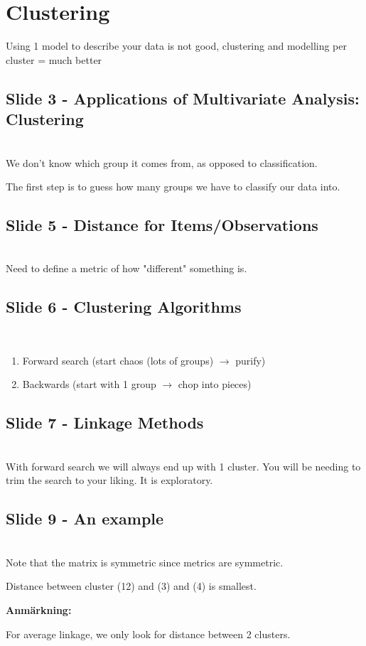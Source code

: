 \section{Clustering}
Using 1 model to describe your data is not good, clustering and modelling per cluster = much better
\par\bigskip
\subsection{Slide 3 - Applications of Multivariate Analysis: Clustering}\hfill\\
\noindent We don't know which group it comes from, as opposed to classification.\par
\noindent The first step is to guess how many groups we have to classify our data into.
\par\bigskip
\subsection{Slide 5 - Distance for Items/Observations}\hfill\\
Need to define a metric of how "different" something is.
\par\bigskip
\subsection{Slide 6 - Clustering Algorithms}\hfill\\
\begin{enumerate}[leftmargin=*]
  \item Forward search (start chaos (lots of groups) $\rightarrow$ purify)
    \par\bigskip
  \item Backwards (start with 1 group $\rightarrow$ chop into pieces)
\end{enumerate}
\par\bigskip
\subsection{Slide 7 - Linkage Methods}\hfill\\
\noindent With forward search we will always end up with 1 cluster. You will be needing to trim the search to your liking. It is exploratory.
\par\bigskip
\subsection{Slide 9 - An example}\hfill\\
\noindent Note that the matrix is symmetric since metrics are symmetric.\par
\noindent Distance between cluster (12) and (3) and (4) is smallest.
\par\bigskip
\noindent\textbf{Anmärkning:}\par
\noindent For average linkage, we only look for distance between 2 clusters.
\par\bigskip
